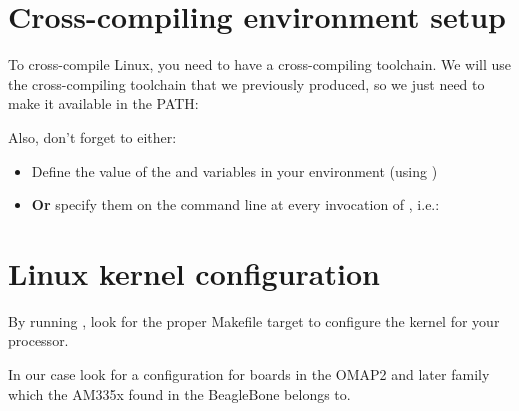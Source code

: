 
\section{Cross-compiling environment setup}

To cross-compile Linux, you need to have a cross-compiling
toolchain. We will use the cross-compiling toolchain that we
previously produced, so we just need to make it available in the PATH:


Also, don't forget to either:

\begin{itemize}
\item Define the value of the  and 
  variables in your environment (using )
\item {\bf Or} specify them on the command line at every invocation of
  , i.e.: 
\end{itemize}


\section{Linux kernel configuration}

By running , look for the proper Makefile target to
configure the kernel for your processor.


{In our case look for a configuration for boards in the OMAP2 and
later family which the AM335x found in the BeagleBone belongs to.}{}

